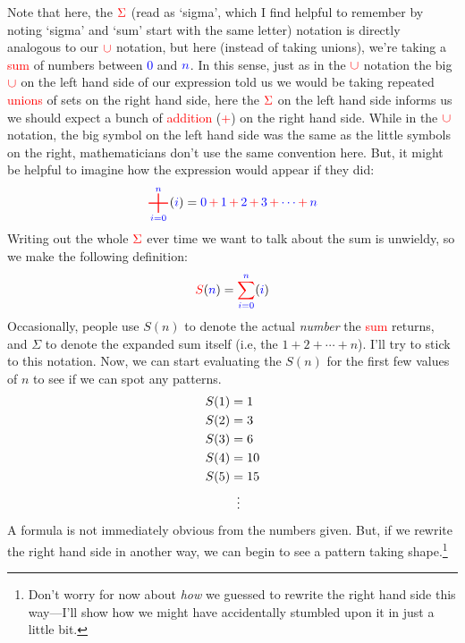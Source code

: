\documentclass[10pt]{article}
\newcommand{\cvdots}[1][=]{\mathrel{\makebox[\widthof{#1}]{\vdots}}}
\DeclareMathOperator*{\bigplus}{\text{\fontsize{25}{35}\selectfont $+$}}
\theoremstyle{definition}
\begin{document}
Note that here, the $\color{red}\Sigma$ (read as `sigma', which I find helpful to remember by noting `sigma' and `sum' start with the same letter) notation is directly analogous to our $\color{red}\cup$ notation, but here (instead of taking unions), we're taking a \textcolor{red}{sum} of numbers between \textcolor{blue}{0} and $\textcolor{blue}{n}$.  In this sense, just as in the $\color{red}\cup$ notation the big $\color{red}\cup$ on the left hand side of our expression told us we would be taking repeated \textcolor{red}{unions} of sets on the right hand side, here the $\color{red}\Sigma$ on the left hand side informs us we should expect a bunch of \textcolor{red}{addition} (\textcolor{red}{+}) on the right hand side.  While in the $\color{red}\cup$ notation, the big symbol on the left hand side was the same as the little symbols on the right, mathematicians don't use the same convention here.  But, it might be helpful to imagine how the expression would appear if they did:
\[\raisebox{-.45\depth}{$\displaystyle\color{red}\bigplus^{{\color{blue}n}}_{{\color{blue}i=0}}$} ({\color{blue}i}) = \textcolor{blue}{0} \,{\color{red}+}\,\textcolor{blue}{1} \,{\color{red}+}\, \textcolor{blue}{2} \,{\color{red}+}\, \textcolor{blue}{3} \,{\color{red}+}\, \textcolor{blue}{\cdots} \,{\color{red}+}\, \textcolor{blue}{n}\]
Writing out the whole $\textcolor{red}{\Sigma}$ ever time we want to talk about the sum is unwieldy, so we make the following definition:
\[\textcolor{red}{S}(\textcolor{blue}{n}) = {\color{red}\sum^{{\color{blue}n}}_{\color{blue} i=0}} ({\color{blue}i})\]
Occasionally, people use $S(n)$ to denote the actual \emph{number} the \textcolor{red}{sum} returns, and $\Sigma$ to denote the expanded sum itself (i.e, the $1+2+\cdots+n$).  I'll try to stick to this notation.  Now, we can start evaluating the $S(n)$ for the first few values of $n$ to see if we can spot any patterns.
\begin{align*}
S(1) &= 1 \\
S(2) &= 3 \\ 
S(3) &= 6 \\ 
S(4) &= 10 \\ 
S(5) &= 15 \\
&\cvdots
\end{align*}
A formula is not immediately obvious from the numbers given.  But, if we rewrite the right hand side in another way, we can begin to see a pattern taking shape.\footnote{Don't worry for now about \emph{how} we guessed to rewrite the right hand side this way---I'll show how we might have accidentally stumbled upon it in just a little bit.}
\end{document}
